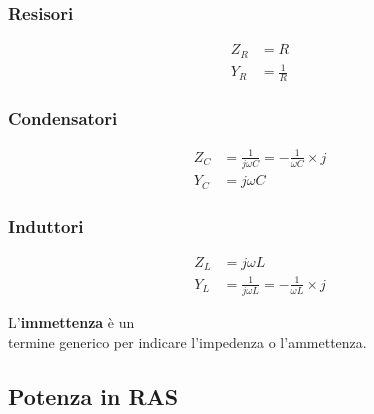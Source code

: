 \documentclass[10pt]{article}
\begin{document}
        \begin{multicols}{4}
            
            \subsubsection*{Resisori}

                \begin{align*}
                    Z_R &= R\\
                    Y_R &= \frac{1}{R}
                \end{align*}

            \vfill\null
            \columnbreak

            \subsubsection*{Condensatori}

                \begin{align*}
                    Z_C &= \frac{1}{j \omega C} = - \frac{1}{\omega C} \times j\\
                    Y_C &= j \omega C
                \end{align*}

            \vfill\null
            \columnbreak

            \subsubsection*{Induttori}

                \begin{align*}
                    Z_L &= j \omega L\\
                    Y_L &= \frac{1}{j \omega L} = -\frac{1}{\omega L} \times j
                \end{align*}

            \vfill\null
            \columnbreak

            \noindent L'\textbf{immettenza} è un\\termine generico per indicare l'impedenza o l'ammettenza.

        \end{multicols}

    \vspace{-3\baselineskip}
    \subsection*{Potenza in RAS}
    \vspace{-1.5\baselineskip}
\end{document}
